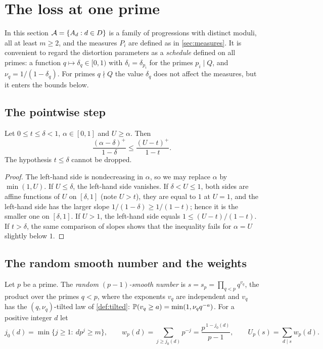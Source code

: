 \section{The loss at one prime}\label{sec:loss}

In this section $\cA=\{A_d:d\in D\}$ is a family of progressions with distinct moduli, all at least $m\ge2$, and
the measures $P_i$ are defined as in \cref{sec:measures}. It is convenient to regard the distortion parameters as
a \emph{schedule} defined on all primes: a function $q\mapsto\delta_q\in[0,1)$ with $\delta_i=\delta_{p_i}$ for the
primes $p_i\mid Q$, and $\nu_q=1/(1-\delta_q)$. For primes $q\nmid Q$ the value $\delta_q$ does not affect the
measures, but it enters the bounds below.

\subsection{The pointwise step}

\begin{lemma}\label{lem:pointwise}
Let $0\le t\le\delta<1$, $\alpha\in[0,1]$ and $U\ge\alpha$. Then
\[
  \frac{(\alpha-\delta)^+}{1-\delta}\le\frac{(U-t)^+}{1-t}.
\]
The hypothesis $t\le\delta$ cannot be dropped.
\end{lemma}

\begin{proof}
The left-hand side is nondecreasing in $\alpha$, so we may replace $\alpha$ by $\min(1,U)$. If $U\le\delta$, the
left-hand side vanishes. If $\delta<U\le1$, both sides are affine functions of $U$ on $[\delta,1]$ (note $U>t$),
they are equal to $1$ at $U=1$, and the left-hand side has the larger slope $1/(1-\delta)\ge1/(1-t)$; hence it is
the smaller one on $[\delta,1]$. If $U>1$, the left-hand side equals $1\le(U-t)/(1-t)$. If $t>\delta$, the same
comparison of slopes shows that the inequality fails for $\alpha=U$ slightly below $1$.
\end{proof}

\subsection{The random smooth number and the weights}\label{sec:smooth}

\begin{definition}\label{def:smooth}
Let $p$ be a prime. The \emph{random $(p-1)$-smooth number} is $s=s_p=\prod_{q<p}q^{v_q}$, the product over the
primes $q<p$, where the exponents $v_q$ are independent and $v_q$ has the $(q,\nu_q)$-tilted law of
\cref{def:tilted}: $\P(v_q\ge a)=\min(1,\nu_qq^{-a})$. For a positive integer $d$ let
\[
  j_0(d)=\min\{j\ge1:\ dp^j\ge m\},\qquad
  w_p(d)=\sum_{j\ge j_0(d)}p^{-j}=\frac{p^{\,1-j_0(d)}}{p-1},\qquad
  U_p(s)=\sum_{d\mid s}w_p(d).
\]
\end{definition}


